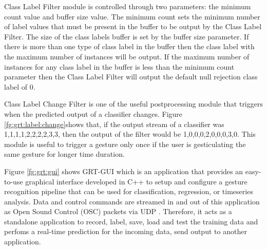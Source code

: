 Class Label Filter module is controlled through two parameters: the minimum count value and buffer size value. The minimum count sets the minimum number of label values that must be present in the buffer to be output by the Class Label Filter. The size of the class labels buffer is set by the buffer size parameter. If there is more than one type of class label in the buffer then the class label with the maximum number of instances will be output. If the maximum number of instances for any class label in the buffer is less than the minimum count parameter then the Class Label Filter will output the default null rejection class label of 0.



Class Label Change Filter is one of the useful postprocessing module that triggers when the predicted output of a classifier changes. Figure \ref{fg:grt:label:change}shows that, if the output stream of a classifier was {1,1,1,1,2,2,2,2,3,3}, then the output of the filter would be {1,0,0,0,2,0,0,0,3,0}. This module is useful to trigger a gesture only once if the user is gesticulating the same gesture for longer time duration. 

Figure \ref{fg:grt:gui} shows GRT-GUI which is an application that provides an easy-to-use graphical interface developed in C++ to setup and configure a gesture recognition pipeline that can be used for classification, regression, or timeseries analysis. Data and control commands are streamed in and out of this application as Open Sound Control (OSC) packets via UDP . Therefore, it acts as a standalone application to record, label, save, load and test the training data and perfoms a real-time prediction for the incoming data, send output to another application. 

 
